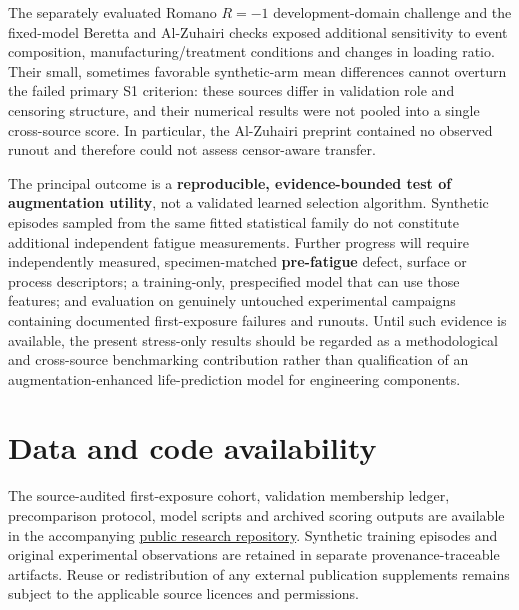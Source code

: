 \documentclass[12pt,a4paper]{article}
\begin{document}
The separately evaluated Romano \(R=-1\) development-domain challenge and the fixed-model Beretta and Al-Zuhairi checks exposed additional sensitivity to event composition, manufacturing/treatment conditions and changes in loading ratio. Their small, sometimes favorable synthetic-arm mean differences cannot overturn the failed primary S1 criterion: these sources differ in validation role and censoring structure, and their numerical results were not pooled into a single cross-source score. In particular, the Al-Zuhairi preprint contained no observed runout and therefore could not assess censor-aware transfer.

The principal outcome is a \textbf{reproducible, evidence-bounded test of augmentation utility}, not a validated learned selection algorithm. Synthetic episodes sampled from the same fitted statistical family do not constitute additional independent fatigue measurements. Further progress will require independently measured, specimen-matched \textbf{pre-fatigue} defect, surface or process descriptors; a training-only, prespecified model that can use those features; and evaluation on genuinely untouched experimental campaigns containing documented first-exposure failures and runouts. Until such evidence is available, the present stress-only results should be regarded as a methodological and cross-source benchmarking contribution rather than qualification of an augmentation-enhanced life-prediction model for engineering components.

\section*{Data and code availability}

The source-audited first-exposure cohort, validation membership ledger, precomparison protocol, model scripts and archived scoring outputs are available in the accompanying \href{https://github.com/sreearravind/Synthetic-Augmentation-for-Censor-Aware-Fatigue-Life-Prediction-of-LPBF-Al}{public research repository}. Synthetic training episodes and original experimental observations are retained in separate provenance-traceable artifacts. Reuse or redistribution of any external publication supplements remains subject to the applicable source licences and permissions.

\clearpage
\end{document}

